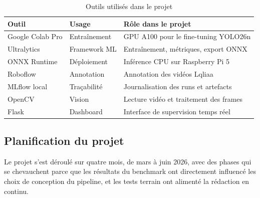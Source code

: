 \begin{table}[H]
\centering
\caption{Outils utilisés dans le projet}
\begin{tabularx}{\textwidth}{llX}
\toprule
\textbf{Outil} & \textbf{Usage} &
\textbf{Rôle dans le projet} \\
\midrule
Google Colab Pro & Entraînement &
GPU A100 pour le fine-tuning YOLO26n \\
Ultralytics & Framework ML &
Entraînement, métriques, export ONNX \\
ONNX Runtime & Déploiement &
Inférence CPU sur Raspberry Pi 5 \\
Roboflow & Annotation &
Annotation des vidéos Lqliaa \\
MLflow local & Traçabilité &
Journalisation des runs et artefacts \\
OpenCV & Vision &
Lecture vidéo et traitement des frames \\
Flask & Dashboard &
Interface de supervision temps réel \\
\bottomrule
\end{tabularx}
\label{tab:outils}
\end{table}

\subsection{Planification du projet}

Le projet s'est déroulé sur quatre mois,
de mars à juin 2026, avec des phases qui
se chevauchent parce que les résultats
du benchmark ont directement influencé
les choix de conception du pipeline,
et les tests terrain ont alimenté la
rédaction en continu.

